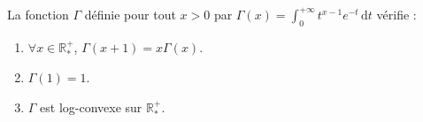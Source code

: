 






  \begin{exercice}
    \label{caracterisation-reelle-de-gamma-1}
    La fonction $\Gamma$ définie pour tout $x > 0$ par $\Gamma(x) = \int_0^{+\infty} t^{x-1} e^{-t} \, \mathrm{d}t$ vérifie :
    \begin{enumerate}[label=(\roman*)]
      \item \label{caracterisation-reelle-de-gamma-2} $\forall x \in \mathbb{R}^+_*$, $\Gamma(x+1) = x\Gamma(x)$.
      \item \label{caracterisation-reelle-de-gamma-3} $\Gamma(1) = 1$.
      \item \label{caracterisation-reelle-de-gamma-4} $\Gamma$ est log-convexe sur $\mathbb{R}^+_*$.
    \end{enumerate}
  \end{exercice}

